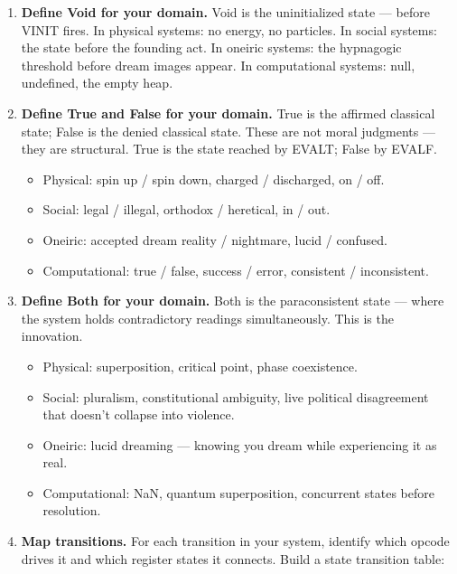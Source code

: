 \documentclass[12pt,a4paper]{article}
\begin{document}
\begin{enumerate}[label=\textbf{3.\arabic*.}, leftmargin=2em]
\item \textbf{Define Void for your domain.} Void is the uninitialized state — before
    VINIT fires. In physical systems: no energy, no particles. In social systems: the
    state before the founding act. In oneiric systems: the hypnagogic threshold before
    dream images appear. In computational systems: null, undefined, the empty heap.

\item \textbf{Define True and False for your domain.} True is the affirmed classical
    state; False is the denied classical state. These are not moral judgments — they
    are structural. True is the state reached by EVALT; False by EVALF.
    \begin{itemize}
    \item Physical: spin up / spin down, charged / discharged, on / off.
    \item Social: legal / illegal, orthodox / heretical, in / out.
    \item Oneiric: accepted dream reality / nightmare, lucid / confused.
    \item Computational: true / false, success / error, consistent / inconsistent.
    \end{itemize}

\item \textbf{Define Both for your domain.} Both is the paraconsistent state — where
    the system holds contradictory readings simultaneously. This is the innovation.
    \begin{itemize}
    \item Physical: superposition, critical point, phase coexistence.
    \item Social: pluralism, constitutional ambiguity, live political disagreement
        that doesn't collapse into violence.
    \item Oneiric: lucid dreaming — knowing you dream while experiencing it as real.
    \item Computational: NaN, quantum superposition, concurrent states before resolution.
    \end{itemize}

\item \textbf{Map transitions.} For each transition in your system, identify which
    opcode drives it and which register states it connects. Build a state transition
    table:


\end{enumerate}
\end{document}
